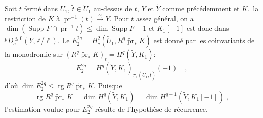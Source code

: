 \documentclass[12pt,a4paper]{article}
\theoremstyle{plain}
\theoremstyle{definition}
\DeclareMathOperator{\Supp}{Supp}
\DeclareMathOperator{\rg}{rg}
\newcommand{\isom}{\xrightarrow{\sim}}
\providecommand{\pr}{\operatorname{pr}}
\begin{document}
Soit $t$ ferm\'{e} dans $U_{1}$, $\tilde{t} \in \tilde{U}_{1}$ au-dessus de $t$, $Y$ et $\tilde{Y}$ comme pr\'{e}c\'{e}demment et $K_{1}$ la restriction de $K$ \`{a} $\pr^{-1}(t) \isom Y$. Pour $t$ assez g\'{e}n\'{e}ral, on a $\dim(\Supp F \cap \pr^{-1}t) \leq \dim \Supp F - 1$ et $K_{1}[-1]$ est donc dans ${}^{p}D_{c}^{\leq 0}(Y, \mathbb{Z}/\ell)$. Le $E_{2}^{2q} = H_{c}^{2}(\tilde{U}_{1}, R^{q}\tilde{\pr}_{*}K)$ est donn\'{e} par les coinvariants de la monodromie sur $(R^{q}\tilde{\pr}_{*}K)_{\tilde{t}} = H^{q}(\tilde{Y}, K_{1})$:
\[
E_{2}^{2q} = H^{q}(\tilde{Y}, K_{1})_{\pi_{1}(\tilde{U}_{1}, \tilde{t})}(-1)\quad,
\]
d'o\`{u} $\dim E_{2}^{2q} \leq \rg R^{q}\tilde{\pr}_{*}K$. Puisque
\begin{equation}\label{eq:4.5.1.1}
\rg R^{q}\tilde{\pr}_{*}K = \dim H^{q}(\tilde{Y}, K_{1}) = \dim H^{q+1}(\tilde{Y}, K_{1}[-1])\;,
\end{equation}
l'estimation voulue pour $E_{2}^{2q}$ r\'{e}sulte de l'hypoth\`{e}se de r\'{e}currence.
\end{document}
